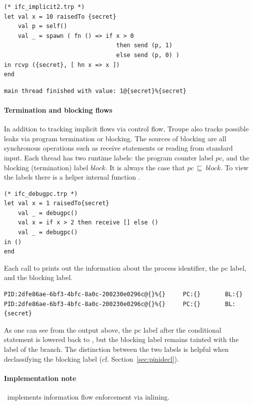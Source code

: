 \begin{lstlisting}
(* ifc_implicit2.trp *)
let val x = 10 raisedTo {secret}
    val p = self()
    val _ = spawn ( fn () => if x > 0 
    							then send (p, 1) 
    							else send (p, 0) )
in rcvp ({secret}, [ hn x => x ])
end
\end{lstlisting}
\begin{verbatim}
main thread finished with value: 1@{secret}%{secret}
\end{verbatim}


\paragraph{Termination and blocking flows} 
In addition to tracking implicit flows via control flow, Troupe also 
tracks possible leaks via program termination or blocking.
The sources of blocking are all synchronous operations such as receive statements or reading from standard input. 
Each thread has two runtime labels: the program counter label $\mathit{pc}$, and 
the blocking (termination) label $\mathit{block}$. It is always the case that 
$\mathit{pc}~\sqsubseteq~\mathit{block}$. To view the labels there is a 
helper internal function .
\begin{lstlisting}
(* ifc_debugpc.trp *)
let val x = 1 raisedTo{secret}
    val _ = debugpc() 
    val x = if x > 2 then receive [] else () 
    val _ = debugpc() 
in () 
end    
\end{lstlisting}

Each call to  prints out the information about the process identifier,
the pc label, and the blocking label.
\begin{verbatim}
PID:2dfe86ae-6bf3-4bfc-8a0c-200230e0296c@{}%{}     PC:{}       BL:{}                
PID:2dfe86ae-6bf3-4bfc-8a0c-200230e0296c@{}%{}     PC:{}       BL:{secret}           
\end{verbatim}
As one can see from the output above, the pc label after the conditional
statement is lowered back to \lev{}, but the blocking label remains tainted 
with the label of the branch. The distinction between the two labels
is helpful when declassifying the blocking label (cf. Section~\ref{sec:pinidecl}).



\paragraph{Implementation note}
\troupelang\ implements information flow enforcement via inlining.



